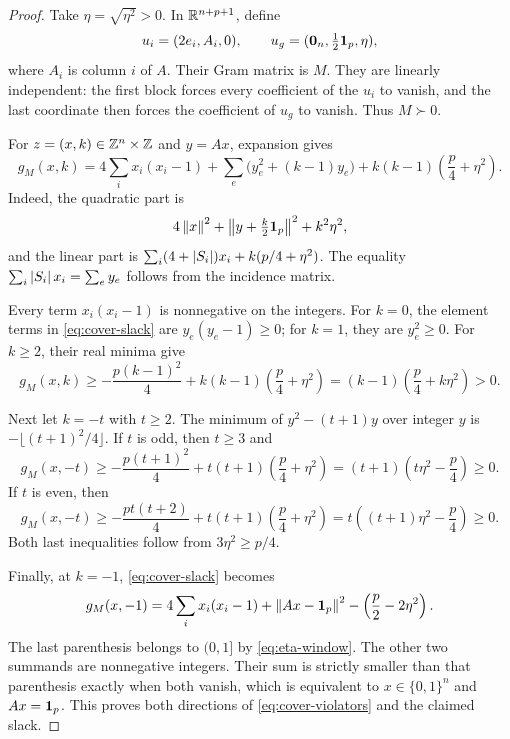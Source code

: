 \begin{proof}
Take $\eta=\sqrt{\eta^2}>0$.  In $\mathbb R^{n+p+1}$, define
\[
  u_i=(2e_i,A_i,0),\qquad
  u_g=(\mathbf 0_n,\tfrac12\mathbf 1_p,\eta),
\]
where $A_i$ is column $i$ of $A$.  Their Gram matrix is $M$.  They are
linearly independent: the first block forces every coefficient of the
$u_i$ to vanish, and the last coordinate then forces the coefficient of
$u_g$ to vanish.  Thus $M\succ0$.

For $z=(x,k)\in\mathbb Z^n\times\mathbb Z$ and $y=Ax$, expansion gives
\begin{equation}\label{eq:cover-slack}
  g_M(x,k)
  =4\sum_i x_i(x_i-1)
   +\sum_e\bigl(y_e^2+(k-1)y_e\bigr)
   +k(k-1)\left(\frac p4+\eta^2\right).
\end{equation}
Indeed, the quadratic part is
\[
  4\left\lVert x\right\rVert^2+\left\lVert y+\tfrac k2\mathbf 1_p\right\rVert^2+k^2\eta^2,
\]
and the linear part is
$\sum_i(4+\left\lvert S_i\right\rvert)x_i+k(p/4+\eta^2)$.  The equality
$\sum_i\left\lvert S_i\right\rvert x_i=\sum_e y_e$ follows from the incidence matrix.

Every term $x_i(x_i-1)$ is nonnegative on the integers.  For $k=0$, the
element terms in \eqref{eq:cover-slack} are $y_e(y_e-1)\geq0$; for $k=1$,
they are $y_e^2\geq0$.  For $k\geq2$, their real minima give
\[
  g_M(x,k)
  \geq-\frac{p(k-1)^2}{4}
       +k(k-1)\left(\frac p4+\eta^2\right)
  =(k-1)\left(\frac p4+k\eta^2\right)>0.
\]

Next let $k=-t$ with $t\geq2$.  The minimum of
$y^2-(t+1)y$ over integer $y$ is
$-\lfloor(t+1)^2/4\rfloor$.  If $t$ is odd, then $t\geq3$ and
\[
  g_M(x,-t)
  \geq-\frac{p(t+1)^2}{4}
       +t(t+1)\left(\frac p4+\eta^2\right)
  =(t+1)\left(t\eta^2-\frac p4\right)\geq0.
\]
If $t$ is even, then
\[
  g_M(x,-t)
  \geq-\frac{pt(t+2)}4
       +t(t+1)\left(\frac p4+\eta^2\right)
  =t\left((t+1)\eta^2-\frac p4\right)\geq0.
\]
Both last inequalities follow from $3\eta^2\geq p/4$.

Finally, at $k=-1$, \eqref{eq:cover-slack} becomes
\begin{equation}\label{eq:cover-layer-minus-one}
  g_M(x,-1)
  =4\sum_i x_i(x_i-1)+\left\lVert Ax-\mathbf 1_p\right\rVert^2
    -\left(\frac p2-2\eta^2\right).
\end{equation}
The last parenthesis belongs to $(0,1]$ by
\eqref{eq:eta-window}.  The other two summands are nonnegative integers.
Their sum is strictly smaller than that parenthesis exactly when both
vanish, which is equivalent to $x\in\{0,1\}^n$ and $Ax=\mathbf 1_p$.
This proves both directions of \eqref{eq:cover-violators} and the claimed
slack.
\end{proof}

